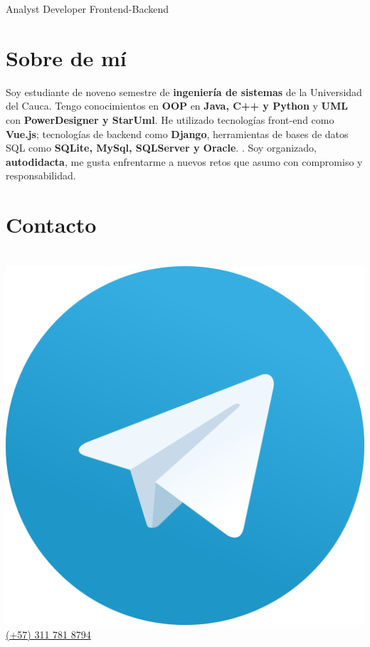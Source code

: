\documentclass[american]{cv-class}
\begin{document}
{Analyst Developer Frontend-Backend}

\vspace{1.15cm}



\begin{aside}


    \vspace{3.2cm}
    
    \section{Sobre de mí}
    \justifying
    \begin{small}
    	{ Soy estudiante de noveno semestre de \textbf{ingeniería de sistemas} de la
     Universidad del Cauca.  Tengo conocimientos en \textbf{OOP} en \textbf{Java, C++ y Python }y \textbf{UML} con \textbf{PowerDesigner y StarUml}. He utilizado tecnologías  front-end como \textbf{Vue.js}; tecnologías de backend como \textbf{Django}, herramientas de bases de datos SQL como \textbf{SQLite, MySql, SQLServer y Oracle}. . Soy organizado, \textbf{autodidacta}, me gusta enfrentarme a nuevos retos que asumo con compromiso y responsabilidad.
    	}
    \end{small}

    
	\section{Contacto}
	\\
	\href{https://msng.link/o/?dawish7=tg}{\raisebox{-0.35ex}
	{\includegraphics[scale=0.0023]{img/telegram-logo.png}} (+57) 311 781 8794}
    

\end{aside}
\end{document}
